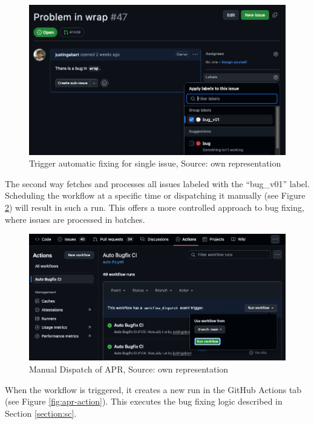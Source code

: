 \begin{figure}[H]
    \centering
    \includegraphics[width=1\textwidth]{images/workflow/label_issue.png}
    \caption{Trigger automatic fixing for single issue, Source: own representation}
    \label{fig:issue-trigger}
\end{figure}

The second way fetches and processes all issues labeled with the ``bug\_v01'' label. Scheduling the workflow at a specific time or dispatching it manually (see Figure \ref{fig:dispatch}) will result in such a run. This offers a more controlled approach to bug fixing, where issues are processed in batches.

\begin{figure}[H]
    \centering
    \includegraphics[width=1\textwidth]{images/workflow/dispatch.png}
    \caption{Manual Dispatch of APR, Source: own representation}
    \label{fig:dispatch}
\end{figure}

When the workflow is triggered, it creates a new run in the GitHub Actions tab (see Figure \ref{fig:apr-action}). This executes the bug fixing logic described in Section \ref{section:sc}.


